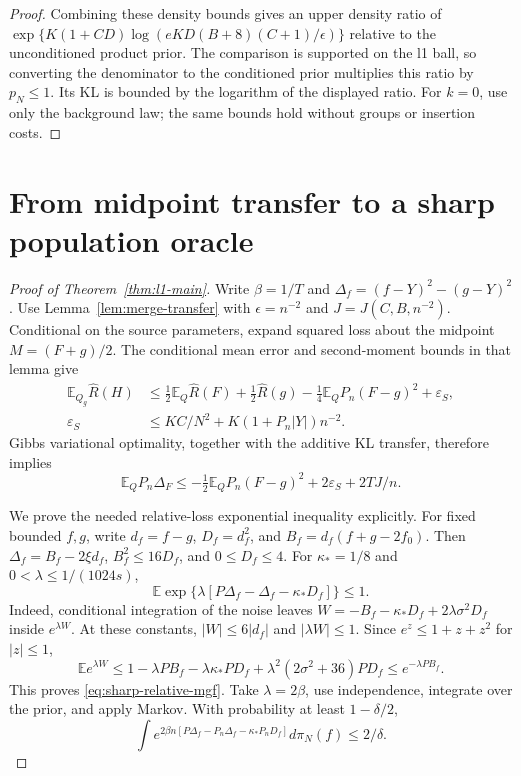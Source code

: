 \begin{proof}
Combining these density bounds gives an upper density ratio of
$\exp\{K(1+CD)\log(eKD(B+8)(C+1)/\epsilon)\}$ relative to the
unconditioned product prior. The comparison is supported on the l1
ball, so converting the denominator to the conditioned prior multiplies
this ratio by $p_N\le1$. Its KL is bounded by the logarithm of the
displayed ratio. For $k=0$, use only the background law; the same bounds
hold without groups or insertion costs.
\end{proof}


\section{From midpoint transfer to a sharp population oracle}
\label{sec:sharp-statistics}
\begin{proof}[Proof of Theorem~\ref{thm:l1-main}]
Write $\beta=1/T$ and $\Delta_f=(f-Y)^2-(g-Y)^2$. Use
Lemma~\ref{lem:merge-transfer} with $\epsilon=n^{-2}$ and
$J=J(C,B,n^{-2})$. Conditional on the source parameters, expand squared
loss about the midpoint $M=(F+g)/2$. The conditional mean error and
second-moment bounds in that lemma give
\begin{align*}
 \mathbb E_{Q_g}\widehat R(H)
 &\le\tfrac12\mathbb E_Q\widehat R(F)+\tfrac12\widehat R(g)
       -\tfrac14\mathbb E_QP_n(F-g)^2+\varepsilon_S,\\
 \varepsilon_S&\le K C/N^2+K(1+P_n|Y|)n^{-2}.
\end{align*}
Gibbs variational optimality, together with the additive KL transfer,
therefore implies
\begin{equation}
 \mathbb E_QP_n\Delta_F
 \le-\tfrac12\mathbb E_QP_n(F-g)^2
            +2\varepsilon_S+2TJ/n.
 \label{eq:sharp-empirical-offset}
\end{equation}

We prove the needed relative-loss exponential inequality explicitly.
For fixed bounded $f,g$, write $d_f=f-g$, $D_f=d_f^2$, and
$B_f=d_f(f+g-2f_0)$. Then
$\Delta_f=B_f-2\xi d_f$, $B_f^2\le16D_f$, and $0\le D_f\le4$.
For $\kappa_*=1/8$ and $0<\lambda\le1/(1024s)$,
\begin{equation}
 \mathbb E\exp\{\lambda[P\Delta_f-\Delta_f-\kappa_*D_f]\}\le1.
 \label{eq:sharp-relative-mgf}
\end{equation}
Indeed, conditional integration of the noise leaves
$W=-B_f-\kappa_*D_f+2\lambda\sigma^2D_f$ inside $e^{\lambda W}$.
At these constants, $|W|\le6|d_f|$ and $|\lambda W|\le1$.
Since $e^z\le1+z+z^2$ for $|z|\le1$,
\[
 \mathbb E e^{\lambda W}
 \le1-\lambda PB_f-\lambda\kappa_*PD_f
       +\lambda^2(2\sigma^2+36)PD_f
 \le e^{-\lambda PB_f}.
\]
This proves \eqref{eq:sharp-relative-mgf}. Take $\lambda=2\beta$,
use independence, integrate over the prior, and apply Markov. With
probability at least $1-\delta/2$,
\begin{equation}
 \int e^{2\beta n[P\Delta_f-P_n\Delta_f-\kappa_*P_nD_f]}
                   d\pi_N(f)\le2/\delta.
 \label{eq:sharp-mgf-event}
\end{equation}


\end{proof}

